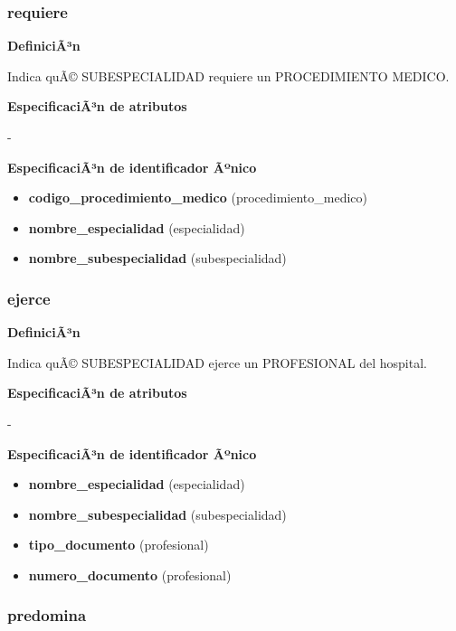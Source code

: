 \documentclass[a4paper,11pt]{article}
\begin{document}
\subsubsection{\textbf{requiere}}

\textbf{DefiniciÃ³n}

Indica quÃ© SUBESPECIALIDAD requiere un PROCEDIMIENTO MEDICO.

\textbf{EspecificaciÃ³n de atributos}

-

\textbf{EspecificaciÃ³n de identificador Ãºnico}

\begin{itemize}

     \item \textbf{codigo\_procedimiento\_medico} (procedimiento\_medico)

     \item \textbf{nombre\_especialidad} (especialidad)

     \item \textbf{nombre\_subespecialidad} (subespecialidad)

\end{itemize}

\subsubsection{\textbf{ejerce}}

\textbf{DefiniciÃ³n}

Indica quÃ© SUBESPECIALIDAD ejerce un PROFESIONAL del hospital.

\textbf{EspecificaciÃ³n de atributos}

-

\textbf{EspecificaciÃ³n de identificador Ãºnico}

\begin{itemize}

     \item \textbf{nombre\_especialidad} (especialidad)

     \item \textbf{nombre\_subespecialidad} (subespecialidad)

     \item \textbf{tipo\_documento} (profesional)

     \item \textbf{numero\_documento} (profesional)

\end{itemize}

\subsubsection{\textbf{predomina}}
\end{document}
